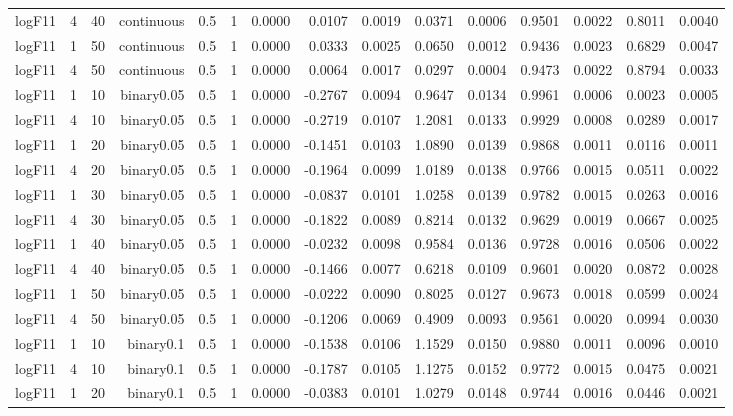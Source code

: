 \begin{longtable}{rrrrrrrrrrrrrrr}
  logF11 & 4 & 40 & continuous & 0.5 & 1 & 0.0000 & 0.0107 & 0.0019 & 0.0371 & 0.0006 & 0.9501 & 0.0022 & 0.8011 & 0.0040 \\ 
  logF11 & 1 & 50 & continuous & 0.5 & 1 & 0.0000 & 0.0333 & 0.0025 & 0.0650 & 0.0012 & 0.9436 & 0.0023 & 0.6829 & 0.0047 \\ 
  logF11 & 4 & 50 & continuous & 0.5 & 1 & 0.0000 & 0.0064 & 0.0017 & 0.0297 & 0.0004 & 0.9473 & 0.0022 & 0.8794 & 0.0033 \\ 
  logF11 & 1 & 10 & binary0.05 & 0.5 & 1 & 0.0000 & -0.2767 & 0.0094 & 0.9647 & 0.0134 & 0.9961 & 0.0006 & 0.0023 & 0.0005 \\ 
  logF11 & 4 & 10 & binary0.05 & 0.5 & 1 & 0.0000 & -0.2719 & 0.0107 & 1.2081 & 0.0133 & 0.9929 & 0.0008 & 0.0289 & 0.0017 \\ 
  logF11 & 1 & 20 & binary0.05 & 0.5 & 1 & 0.0000 & -0.1451 & 0.0103 & 1.0890 & 0.0139 & 0.9868 & 0.0011 & 0.0116 & 0.0011 \\ 
  logF11 & 4 & 20 & binary0.05 & 0.5 & 1 & 0.0000 & -0.1964 & 0.0099 & 1.0189 & 0.0138 & 0.9766 & 0.0015 & 0.0511 & 0.0022 \\ 
  logF11 & 1 & 30 & binary0.05 & 0.5 & 1 & 0.0000 & -0.0837 & 0.0101 & 1.0258 & 0.0139 & 0.9782 & 0.0015 & 0.0263 & 0.0016 \\ 
  logF11 & 4 & 30 & binary0.05 & 0.5 & 1 & 0.0000 & -0.1822 & 0.0089 & 0.8214 & 0.0132 & 0.9629 & 0.0019 & 0.0667 & 0.0025 \\ 
  logF11 & 1 & 40 & binary0.05 & 0.5 & 1 & 0.0000 & -0.0232 & 0.0098 & 0.9584 & 0.0136 & 0.9728 & 0.0016 & 0.0506 & 0.0022 \\ 
  logF11 & 4 & 40 & binary0.05 & 0.5 & 1 & 0.0000 & -0.1466 & 0.0077 & 0.6218 & 0.0109 & 0.9601 & 0.0020 & 0.0872 & 0.0028 \\ 
  logF11 & 1 & 50 & binary0.05 & 0.5 & 1 & 0.0000 & -0.0222 & 0.0090 & 0.8025 & 0.0127 & 0.9673 & 0.0018 & 0.0599 & 0.0024 \\ 
  logF11 & 4 & 50 & binary0.05 & 0.5 & 1 & 0.0000 & -0.1206 & 0.0069 & 0.4909 & 0.0093 & 0.9561 & 0.0020 & 0.0994 & 0.0030 \\ 
  logF11 & 1 & 10 & binary0.1 & 0.5 & 1 & 0.0000 & -0.1538 & 0.0106 & 1.1529 & 0.0150 & 0.9880 & 0.0011 & 0.0096 & 0.0010 \\ 
  logF11 & 4 & 10 & binary0.1 & 0.5 & 1 & 0.0000 & -0.1787 & 0.0105 & 1.1275 & 0.0152 & 0.9772 & 0.0015 & 0.0475 & 0.0021 \\ 
  logF11 & 1 & 20 & binary0.1 & 0.5 & 1 & 0.0000 & -0.0383 & 0.0101 & 1.0279 & 0.0148 & 0.9744 & 0.0016 & 0.0446 & 0.0021 \\ 

\end{longtable}

